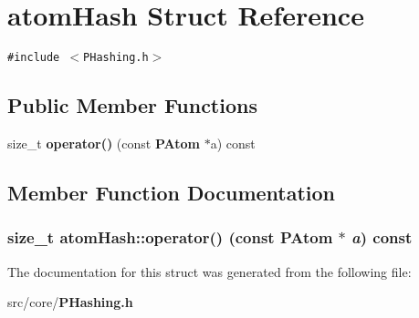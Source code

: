 \section{atom\-Hash Struct Reference}
\label{structatomHash}
{\tt \#include $<$PHashing.h$>$}

\subsection*{Public Member Functions}
\begin{CompactItemize}
\item 
size\_\-t {\bf operator()} (const {\bf PAtom} $\ast$a) const 
\end{CompactItemize}


\subsection{Member Function Documentation}
\subsubsection{\setlength{\rightskip}{0pt plus 5cm}size\_\-t atom\-Hash::operator() (const {\bf PAtom} $\ast$ {\em a}) const\hspace{0.3cm}{\tt  [inline]}}\label{structatomHash_8adfd8b1763e3c506a9fa58a916336de}




The documentation for this struct was generated from the following file:\begin{CompactItemize}
\item 
src/core/{\bf PHashing.h}\end{CompactItemize}
